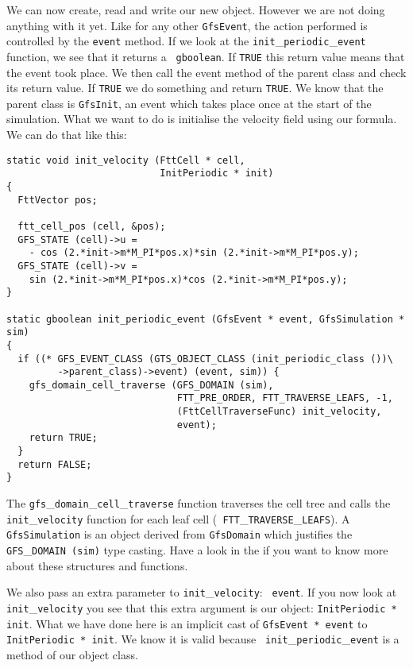 \documentclass[a4paper]{article}
\begin{document}
We can now create, read and write our new object. However we are not doing
anything with it yet. Like for any other {\tt GfsEvent}, the action
performed is controlled by the {\tt event} method. If we look at the
{\tt init}\_{\tt periodic}\_{\tt event} function, we see that it returns a {\tt
gboolean}. If {\tt TRUE} this return value means that the event took
place. We then call the event method of the parent class and check its 
return value. If {\tt TRUE} we do something and return {\tt TRUE}. We
know that the parent class is {\tt GfsInit}, an event which takes
place once at the start of the simulation. What we want to do is
initialise the velocity field using our formula. We can do that like this:
\begin{verbatim}
static void init_velocity (FttCell * cell,
                           InitPeriodic * init)
{
  FttVector pos;

  ftt_cell_pos (cell, &pos);
  GFS_STATE (cell)->u = 
    - cos (2.*init->m*M_PI*pos.x)*sin (2.*init->m*M_PI*pos.y);
  GFS_STATE (cell)->v =   
    sin (2.*init->m*M_PI*pos.x)*cos (2.*init->m*M_PI*pos.y);
}

static gboolean init_periodic_event (GfsEvent * event, GfsSimulation * sim)
{
  if ((* GFS_EVENT_CLASS (GTS_OBJECT_CLASS (init_periodic_class ())\
         ->parent_class)->event) (event, sim)) {
    gfs_domain_cell_traverse (GFS_DOMAIN (sim), 
                              FTT_PRE_ORDER, FTT_TRAVERSE_LEAFS, -1,
                              (FttCellTraverseFunc) init_velocity,
                              event);
    return TRUE;
  }
  return FALSE;
}
\end{verbatim}
The {\tt gfs}\_{\tt domain}\_{\tt cell}\_{\tt traverse} function traverses the cell tree
and calls the {\tt init}\_{\tt velocity} function for each leaf cell ({\tt
FTT}\_{\tt TRAVERSE}\_{\tt LEAFS}). A {\tt GfsSimulation} is an object derived from
{\tt GfsDomain} which justifies the {\tt GFS}\_{\tt DOMAIN (sim)} type
casting. Have a look in the  if you want to know more
about these structures and functions.

We also pass an extra parameter to {\tt init}\_{\tt velocity}: {\tt
event}. If you now look at {\tt init}\_{\tt velocity} you see that this extra 
argument is our object: {\tt InitPeriodic * init}. What we have done
here is an implicit cast of {\tt GfsEvent * event} to {\tt
InitPeriodic * init}. We know it is valid because {\tt
init}\_{\tt periodic}\_{\tt event} is a method of our object class.
\end{document}
